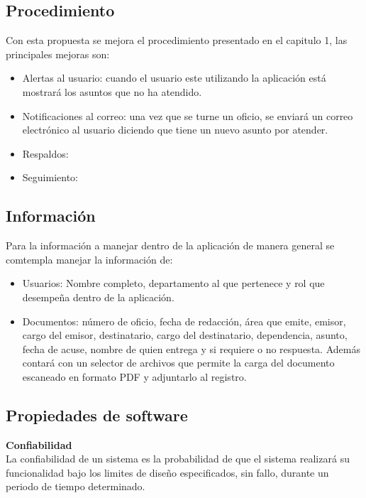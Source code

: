 \subsection{Procedimiento}
Con esta propuesta se mejora el procedimiento presentado en el capitulo 1, las principales mejoras son:
\begin{itemize}
	\item Alertas al usuario: cuando el usuario este utilizando la aplicación está mostrará los asuntos que no ha atendido. 
	\item Notificaciones al correo: una vez que se turne un oficio, se enviará un correo electrónico al usuario diciendo que tiene un nuevo asunto por atender. 
	\item Respaldos: 
	\item Seguimiento: 
\end{itemize}


\subsection{Información}

Para la información a manejar dentro de la aplicación de manera general se comtempla manejar la información de:
\begin{itemize}
	\item Usuarios: Nombre completo, departamento al que pertenece y rol que desempeña dentro de la aplicación.
	\item Documentos: número de oficio, fecha de redacción, área que emite, emisor, cargo del emisor, destinatario, cargo del destinatario, dependencia, asunto, fecha de acuse, nombre de quien entrega y si requiere o no respuesta. Además contará con un selector de archivos que permite la carga del documento escaneado en formato PDF y adjuntarlo al registro.
\end{itemize}

\subsection{Propiedades de software}

\textbf{Confiabilidad\\}
La confiabilidad de un sistema es la probabilidad de que el sistema realizará su funcionalidad bajo los limites de diseño especificados, sin fallo, durante un periodo de tiempo determinado. \\

